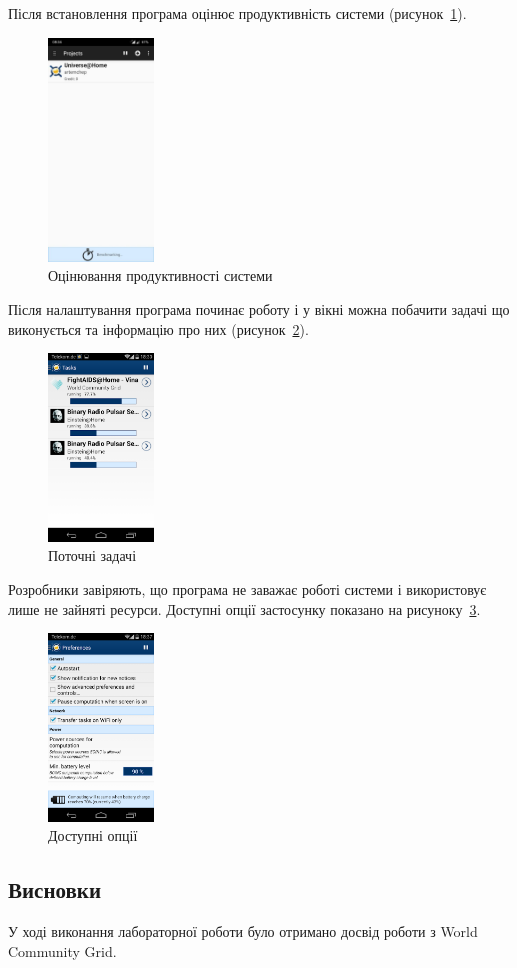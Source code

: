 Після встановлення програма оцінює продуктивність системи (рисунок~\ref{fig:scr_benchmark}).

\begin{figure}[h]
    \centering
    \includegraphics[width=0.25\textwidth]{scr_benchmark}
    \caption{Оцінювання продуктивності системи}
    \label{fig:scr_benchmark}
\end{figure}

Після налаштування програма починає роботу і у вікні можна побачити задачі що виконується та інформацію про них (рисунок~\ref{fig:scr_tasks}).

\begin{figure}[h]
    \centering
    \includegraphics[width=0.25\textwidth]{scr_tasks}
    \caption{Поточні задачі}
    \label{fig:scr_tasks}
\end{figure}

Розробники завіряють, що програма не заважає роботі системи і використовує лише не зайняті ресурси. Доступні опції застосунку показано на рисуноку~\ref{fig:scr_settings}.

\begin{figure}[h]
    \centering
    \includegraphics[width=0.25\textwidth]{scr_settings}
    \caption{Доступні опції}
    \label{fig:scr_settings}
\end{figure}

\subsection*{Висновки} 
У ході виконання лабораторної роботи було отримано досвід роботи з World Community Grid.


